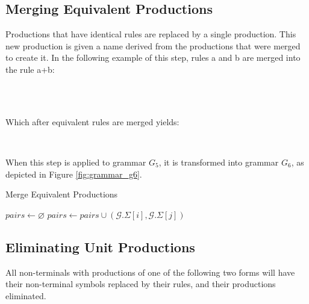 \documentclass[10pt,nocc]{xrese_report}
\begin{document}
\subsection{Merging Equivalent Productions}

Productions that have identical rules are replaced by a single production. This new production is given a name derived from the productions that were merged to create it. In the following example of this step, rules a and b are merged into the rule a+b:

\begin{bnf*}
\\
\\
\end{bnf*}

\noindent Which after equivalent rules are merged yields:

\begin{bnf*}
\\
\end{bnf*}

\noindent When this step is applied to grammar $G_5$, it is transformed into grammar $G_6$, as depicted in Figure \ref{fig:grammar_g6}.

\begin{algorithm}[tb]
\caption{Merge Equivalent Productions}\label{alg:merge_equiv_prod}
 \begin{algorithmic}[1]
    \State $pairs \gets \varnothing$
    \For{$i \in [0,|\mathcal{G}.\Sigma|)$}
          \State $pairs \gets pairs \cup (\mathcal{G}.\Sigma[i], \mathcal{G}.\Sigma[j])$
        \EndIf
      \EndFor
    \EndFor
        \State {}
      \EndIf
    \EndFor
  \EndFunction
 \end{algorithmic}
\end{algorithm}

\subsection{Eliminating Unit Productions}

All non-terminals with productions of one of the following two forms will have their non-terminal symbols replaced by their rules, and their productions eliminated.
\end{document}
